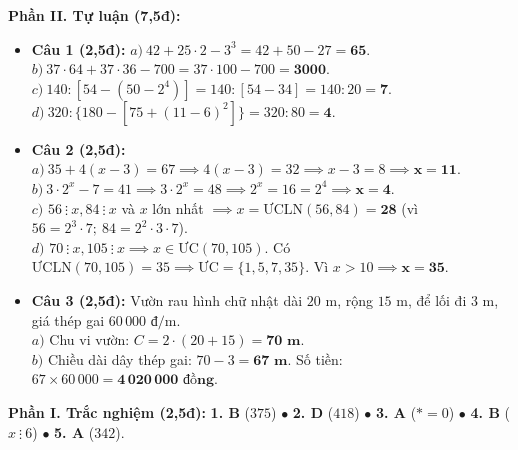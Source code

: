 \documentclass[11pt,a4paper]{article}
\newcommand{\customSubSection}[1]{%
  \vspace{1.2mm}%
  \noindent{\color{brandcyan}\bfseries\normalsize $\blacktriangleright$ #1}\par\vspace{0.4mm}%
}
\begin{document}
\textbf{Phần II. Tự luận (7,5đ):}
\begin{itemize}[leftmargin=1.3em, itemsep=1.2pt]
  \item \textbf{Câu 1 (2,5đ):}
    $a) \ 42 + 25 \cdot 2 - 3^3 = 42 + 50 - 27 = \mathbf{65}$. \quad
    $b) \ 37 \cdot 64 + 37 \cdot 36 - 700 = 37 \cdot 100 - 700 = \mathbf{3000}$.\\
    $c) \ 140 : [54 - (50 - 2^4)] = 140 : [54 - 34] = 140 : 20 = \mathbf{7}$. \quad
    $d) \ 320 : \{180 - [75 + (11 - 6)^2]\} = 320 : 80 = \mathbf{4}$.
  \item \textbf{Câu 2 (2,5đ):}
    $a) \ 35 + 4(x - 3) = 67 \implies 4(x - 3) = 32 \implies x - 3 = 8 \implies \mathbf{x = 11}$.\\
    $b) \ 3 \cdot 2^x - 7 = 41 \implies 3 \cdot 2^x = 48 \implies 2^x = 16 = 2^4 \implies \mathbf{x = 4}$.\\
    $c)$ $56 \ \vdots \ x, 84 \ \vdots \ x$ và $x$ lớn nhất $\implies x = \text{ƯCLN}(56, 84) = \mathbf{28}$ (vì $56 = 2^3 \cdot 7; \ 84 = 2^2 \cdot 3 \cdot 7$).\\
    $d)$ $70 \ \vdots \ x, 105 \ \vdots \ x \implies x \in \text{ƯC}(70, 105)$. Có $\text{ƯCLN}(70, 105) = 35 \implies \text{ƯC} = \{1, 5, 7, 35\}$. Vì $x > 10 \implies \mathbf{x = 35}$.
  \item \textbf{Câu 3 (2,5đ):} Vườn rau hình chữ nhật dài $20\text{ m}$, rộng $15\text{ m}$, để lối đi $3\text{ m}$, giá thép gai $60\,000\text{ đ/m}$.\\
    $a)$ Chu vi vườn: $C = 2 \cdot (20 + 15) = \mathbf{70\text{ m}}$.\\
    $b)$ Chiều dài dây thép gai: $70 - 3 = \mathbf{67\text{ m}}$. Số tiền: $67 \times 60\,000 = \mathbf{4\,020\,000\text{ đồng}}$.
\end{itemize}

\newpage

\customSubSection{3. Chi tiết Mã đề 103}
\textbf{Phần I. Trắc nghiệm (2,5đ):}
\textbf{1. B} ($375$) \quad $\bullet$ \quad
\textbf{2. D} ($418$) \quad $\bullet$ \quad
\textbf{3. A} ($* = 0$) \quad $\bullet$ \quad
\textbf{4. B} ($x \ \vdots \ 6$) \quad $\bullet$ \quad
\textbf{5. A} ($342$).
\end{document}

